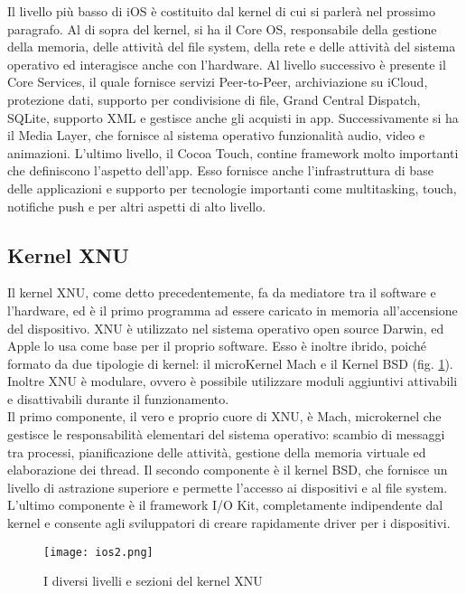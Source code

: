 Il livello più basso di iOS è costituito dal kernel di cui si parlerà nel
prossimo paragrafo. Al di sopra del kernel, si ha il Core OS,
responsabile della gestione della memoria, delle attività del file system, della
rete e delle attività del sistema operativo ed interagisce anche con l’hardware.
Al livello successivo è presente il Core Services, il quale fornisce servizi Peer-to-Peer,
archiviazione su iCloud, protezione dati, supporto per condivisione di file, Grand
Central Dispatch, SQLite, supporto XML e gestisce anche gli acquisti in app. Successivamente
si ha il Media Layer, che fornisce al sistema operativo funzionalità audio, video
e animazioni. L’ultimo livello, il Cocoa Touch, contine framework molto importanti
che definiscono l’aspetto dell’app. Esso fornisce anche l'infrastruttura di base delle
applicazioni e supporto per tecnologie importanti come multitasking, touch,
notifiche push e per altri aspetti di alto livello.

\subsection{Kernel XNU}
Il kernel XNU, come detto precedentemente, fa da mediatore tra il software
e l’hardware, ed è il primo programma ad essere caricato in memoria
all’accensione del dispositivo. XNU è utilizzato nel sistema operativo open source
Darwin, ed Apple lo usa come base per il proprio software. Esso è inoltre
ibrido, poiché formato da due tipologie di kernel: il microKernel Mach e il
Kernel BSD (fig. \ref{ios2}).
Inoltre XNU è modulare, ovvero è possibile utilizzare moduli aggiuntivi
attivabili e disattivabili durante il funzionamento. \\
Il primo componente, il vero e proprio cuore di XNU, è Mach, microkernel che gestisce le
responsabilità elementari del sistema operativo: scambio di messaggi tra
processi, pianificazione delle attività, gestione della memoria virtuale ed
elaborazione dei thread. Il secondo componente è il kernel BSD, che fornisce un
livello di astrazione superiore e permette l’accesso ai dispositivi e al file
system. L’ultimo componente è il framework I/O Kit, completamente indipendente
dal kernel e consente agli sviluppatori di creare rapidamente driver per i
dispositivi. \\
\begin{figure}[!h]
    \centering
    \texttt{[image: ios2.png]}
    \caption{I diversi livelli e sezioni del kernel XNU \cite{xnu}}
    \label{ios2}
\end{figure}


